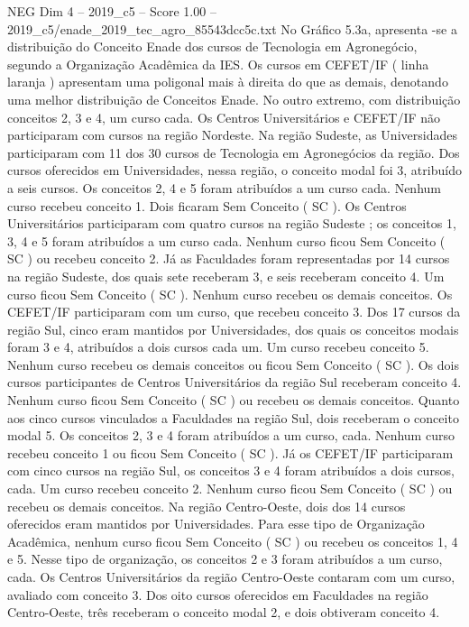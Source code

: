 \begin{textsample}{NEG Dim 4 – 2019\_c5 – Score 1.00 – 2019\_c5/enade\_2019\_tec\_agro\_85543dcc5c.txt}
No Gráfico 5.3a, apresenta -se a distribuição do Conceito Enade dos cursos de Tecnologia em Agronegócio, segundo a Organização Acadêmica da IES.
Os cursos em CEFET/IF ( linha laranja ) apresentam uma poligonal mais à direita do que as demais, denotando uma melhor distribuição de Conceitos Enade.
No outro extremo, com distribuição conceitos 2, 3 e 4, um curso cada.
Os Centros Universitários e CEFET/IF não participaram com cursos na região Nordeste.
Na região Sudeste, as Universidades participaram com 11 dos 30 cursos de Tecnologia em Agronegócios da região.
Dos cursos oferecidos em Universidades, nessa região, o conceito modal foi 3, atribuído a seis cursos.
Os conceitos 2, 4 e 5 foram atribuídos a um curso cada.
Nenhum curso recebeu conceito 1.
Dois ficaram Sem Conceito ( SC ).
Os Centros Universitários participaram com quatro cursos na região Sudeste ; os conceitos 1, 3, 4 e 5 foram atribuídos a um curso cada.
Nenhum curso ficou Sem Conceito ( SC ) ou recebeu conceito 2.
Já as Faculdades foram representadas por 14 cursos na região Sudeste, dos quais sete receberam 3, e seis receberam conceito 4.
Um curso ficou Sem Conceito ( SC ).
Nenhum curso recebeu os demais conceitos.
Os CEFET/IF participaram com um curso, que recebeu conceito 3.
Dos 17 cursos da região Sul, cinco eram mantidos por Universidades, dos quais os conceitos modais foram 3 e 4, atribuídos a dois cursos cada um.
Um curso recebeu conceito 5.
Nenhum curso recebeu os demais conceitos ou ficou Sem Conceito ( SC ).
Os dois cursos participantes de Centros Universitários da região Sul receberam conceito 4.
Nenhum curso ficou Sem Conceito ( SC ) ou recebeu os demais conceitos.
Quanto aos cinco cursos vinculados a Faculdades na região Sul, dois receberam o conceito modal 5.
Os conceitos 2, 3 e 4 foram atribuídos a um curso, cada.
Nenhum curso recebeu conceito 1 ou ficou Sem Conceito ( SC ).
Já os CEFET/IF participaram com cinco cursos na região Sul, os conceitos 3 e 4 foram atribuídos a dois cursos, cada.
Um curso recebeu conceito 2.
Nenhum curso ficou Sem Conceito ( SC ) ou recebeu os demais conceitos.
Na região Centro-Oeste, dois dos 14 cursos oferecidos eram mantidos por Universidades.
Para esse tipo de Organização Acadêmica, nenhum curso ficou Sem Conceito ( SC ) ou recebeu os conceitos 1, 4 e 5.
Nesse tipo de organização, os conceitos 2 e 3 foram atribuídos a um curso, cada.
Os Centros Universitários da região Centro-Oeste contaram com um curso, avaliado com conceito 3.
Dos oito cursos oferecidos em Faculdades na região Centro-Oeste, três receberam o conceito modal 2, e dois obtiveram conceito 4.

\end{textsample}
